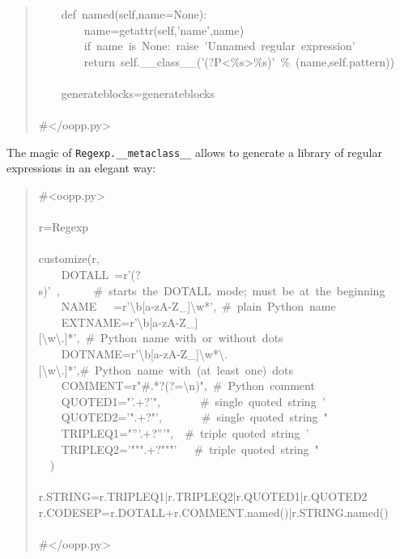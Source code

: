 \documentclass[10pt,english]{article}
\begin{document}
\begin{quote}
\begin{ttfamily}
\begin{flushleft}
\mbox{~~~~def~named(self,name=None):}\\
\mbox{~~~~~~~~name=getattr(self,'name',name)}\\
\mbox{~~~~~~~~if~name~is~None:~raise~'Unnamed~regular~expression'}\\
\mbox{~~~~~~~~return~self.{\_}{\_}class{\_}{\_}('(?P<{\%}s>{\%}s)'~{\%}~(name,self.pattern))}\\
\mbox{}\\
\mbox{~~~~generateblocks=generateblocks}\\
\mbox{}\\
\mbox{{\#}</oopp.py>}
\end{flushleft}\end{ttfamily}
\end{quote}

The magic of \texttt{Regexp.{\_}{\_}metaclass{\_}{\_}} allows to generate a library of 
regular expressions in an elegant way:
\begin{quote}
\begin{ttfamily}\begin{flushleft}
\mbox{{\#}<oopp.py>}\\
\mbox{}\\
\mbox{r=Regexp}\\
\mbox{}\\
\mbox{customize(r,}\\
\mbox{~~~~DOTALL~=r'(?s)'~,~~~~~~{\#}~starts~the~DOTALL~mode;~must~be~at~the~beginning}\\
\mbox{~~~~NAME~~~=r'{\textbackslash}b[a-zA-Z{\_}]{\textbackslash}w*',~{\#}~plain~Python~name}\\
\mbox{~~~~EXTNAME=r'{\textbackslash}b[a-zA-Z{\_}][{\textbackslash}w{\textbackslash}.]*',~{\#}~Python~name~with~or~without~dots}\\
\mbox{~~~~DOTNAME=r'{\textbackslash}b[a-zA-Z{\_}]{\textbackslash}w*{\textbackslash}.[{\textbackslash}w{\textbackslash}.]*',{\#}~Python~name~with~(at~least~one)~dots}\\
\mbox{~~~~COMMENT=r"{\#}.*?(?={\textbackslash}n)",~{\#}~Python~comment}\\
\mbox{~~~~QUOTED1="'.+?'",~~~~~~~{\#}~single~quoted~string~'}\\
\mbox{~~~~QUOTED2='".+?"',~~~~~~~{\#}~single~quoted~string~"}\\
\mbox{~~~~TRIPLEQ1="'''.+?'''",~~{\#}~triple~quoted~string~'}\\
\mbox{~~~~TRIPLEQ2='""".+?"""'~~~{\#}~triple~quoted~string~"~}\\
\mbox{~~)}\\
\mbox{}\\
\mbox{r.STRING=r.TRIPLEQ1|r.TRIPLEQ2|r.QUOTED1|r.QUOTED2}\\
\mbox{r.CODESEP=r.DOTALL+r.COMMENT.named()|r.STRING.named()}\\
\mbox{}\\
\mbox{{\#}</oopp.py>}
\end{flushleft}\end{ttfamily}
\end{quote}
\end{document}
